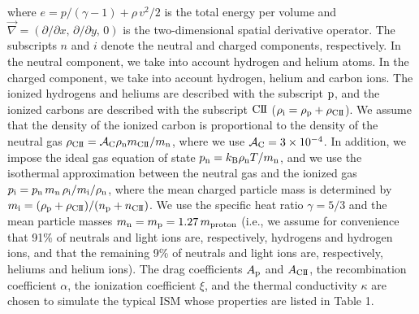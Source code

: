 \documentclass[12pt,preprint]{aastex}
\begin{document}
where $e=p/(\gamma-1)+\rho\,v^{2}/2$ is the total energy per volume and $\vec{\nabla}=(\partial/\partial x,\,\partial/\partial y,\,0)$ is the two-dimensional spatial derivative operator.
The subscripts $n$ and $i$ denote the neutral and charged components, respectively.
In the neutral component, we take into account hydrogen and helium atoms.
In the charged component, we take into account hydrogen, helium and carbon ions.
The ionized hydrogens and heliums are described with the subscript $\rm p$, and the ionized carbons are described with the subscript $\rm CI\hspace{-.1em}I$ ($\rho_{\rm i}=\rho_{\rm p}+\rho_{\rm CI\hspace{-.1em}I}$).
We assume that the density of the ionized carbon is proportional to the density of the neutral gas $\rho_{\rm CI\hspace{-.1em}I}=\mathcal{A}_{\rm C} \rho_{\rm n} m_{\rm CI\hspace{-.1em}I}/m_{\rm n}$, where we use $\mathcal{A}_{\rm C}=3\times 10^{-4}$.
In addition, we impose the ideal gas equation of state $p_{\rm n}=k_{\rm B}\rho_{\rm n}T/m_{\rm n}$, and we use the isothermal approximation between the neutral gas and the ionized gas $p_{\rm i} = p_{\rm n}\,m_{\rm n}\,\rho_{\rm i}/m_{\rm i}/\rho_{\rm n}$, where the mean charged particle mass is determined by $m_{\rm i}=(\rho_{\rm p}+\rho_{\rm CI\hspace{-.1em}I})/(n_{\rm p}+n_{\rm CI\hspace{-.1em}I})$.
We use the specific heat ratio $\gamma=5/3$ and the mean particle masses $m_{\rm n}=m_{\rm p}=1.27\,m_{\rm proton}$ (i.e., we assume for convenience that 91\% of neutrals and light ions are, respectively, hydrogens and hydrogen ions, and that the remaining 9\% of neutrals and light ions are, respectively, heliums and helium ions).
The drag coefficients $A_{\rm p}$ and $A_{\rm CI\hspace{-.1em}I}$, the recombination coefficient $\alpha$, the ionization coefficient $\xi$, and the thermal conductivity $\kappa$ are chosen to simulate the typical ISM whose properties are listed in Table 1.
\end{document}
